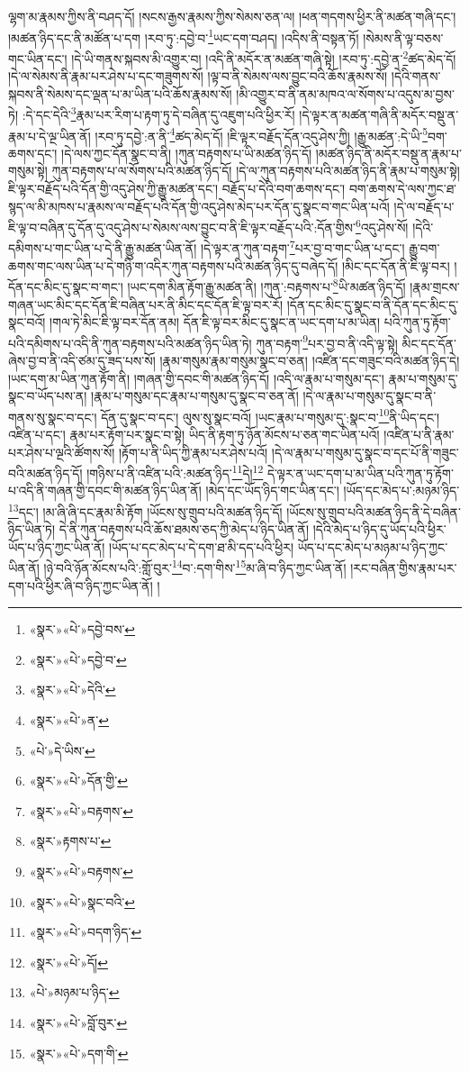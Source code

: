 ལྷག་མ་རྣམས་ཀྱིས་ནི་བཤད་དོ། །སངས་རྒྱས་རྣམས་ཀྱིས་སེམས་ཅན་ལ། །ཕན་གདགས་ཕྱིར་ནི་མཚན་གཞི་དང་། །མཚན་ཉིད་དང་ནི་མཚོན་པ་དག །རབ་ཏུ་:དབྱེ་བ་\footnote{«སྣར་»«པེ་»དབྱེ་བས་}ཡང་དག་བཤད། །འདིས་ནི་བསྟན་ཏོ། །སེམས་ནི་ལྟ་བཅས་གང་ཡིན་དང་། །དེ་ཡི་གནས་སྐབས་མི་འགྱུར་བ། །འདི་ནི་མདོར་ན་མཚན་གཞི་སྟེ། །རབ་ཏུ་:དབྱེ་ན་\footnote{«སྣར་»«པེ་»དབྱེ་བ་}ཚད་མེད་དོ། །དེ་ལ་སེམས་ནི་རྣམ་པར་ཤེས་པ་དང་གཟུགས་སོ། །ལྟ་བ་ནི་སེམས་ལས་བྱུང་བའི་ཆོས་རྣམས་སོ། །དེའི་གནས་སྐབས་ནི་སེམས་དང་ལྡན་པ་མ་ཡིན་པའི་ཆོས་རྣམས་སོ། །མི་འགྱུར་བ་ནི་ནམ་མཁའ་ལ་སོགས་པ་འདུས་མ་བྱས་ཏེ། :དེ་དང་དེའི་\footnote{«སྣར་»«པེ་»དེའི་}རྣམ་པར་རིག་པ་རྟག་ཏུ་དེ་བཞིན་དུ་འཇུག་པའི་ཕྱིར་རོ། །དེ་ལྟར་ན་མཚན་གཞི་ནི་མདོར་བསྡུ་ན་རྣམ་པ་དེ་ལྔ་ཡིན་ནོ། །རབ་ཏུ་དབྱེ་:ན་ནི་\footnote{«སྣར་»«པེ་»ན་}ཚད་མེད་དོ། །ཇི་ལྟར་བརྗོད་དོན་འདུ་ཤེས་ཀྱི། །རྒྱུ་མཚན་:དེ་ཡི་\footnote{«པེ་»དེ་ཡིས་}བག་ཆགས་དང་། །དེ་ལས་ཀྱང་དོན་སྣང་བ་ནི། །ཀུན་བརྟགས་པ་ཡི་མཚན་ཉིད་དོ། །མཚན་ཉིད་ནི་མདོར་བསྡུ་ན་རྣམ་པ་གསུམ་སྟེ། ཀུན་བརྟགས་པ་ལ་སོགས་པའི་མཚན་ཉིད་དོ། །དེ་ལ་ཀུན་བརྟགས་པའི་མཚན་ཉིད་ནི་རྣམ་པ་གསུམ་སྟེ། ཇི་ལྟར་བརྗོད་པའི་དོན་གྱི་འདུ་ཤེས་ཀྱི་རྒྱུ་མཚན་དང་། བརྗོད་པ་དེའི་བག་ཆགས་དང་། བག་ཆགས་དེ་ལས་ཀྱང་ཐ་སྙད་ལ་མི་མཁས་པ་རྣམས་ལ་བརྗོད་པའི་དོན་གྱི་འདུ་ཤེས་མེད་པར་དོན་དུ་སྣང་བ་གང་ཡིན་པའོ། །དེ་ལ་བརྗོད་པ་ཇི་ལྟ་བ་བཞིན་དུ་དོན་དུ་འདུ་ཤེས་པ་སེམས་ལས་བྱུང་བ་ནི་ཇི་ལྟར་བརྗོད་པའི་:དོན་གྱིས་\footnote{«སྣར་»«པེ་»དོན་གྱི་}འདུ་ཤེས་སོ། །དེའི་དམིགས་པ་གང་ཡིན་པ་དེ་ནི་རྒྱུ་མཚན་ཡིན་ནོ། །དེ་ལྟར་ན་ཀུན་བརྟག་\footnote{«སྣར་»«པེ་»བརྟགས་}པར་བྱ་བ་གང་ཡིན་པ་དང་། རྒྱུ་བག་ཆགས་གང་ལས་ཡིན་པ་དེ་གཉི་ག་འདིར་ཀུན་བརྟགས་པའི་མཚན་ཉིད་དུ་བཞེད་དོ། །མིང་དང་དོན་ནི་ཇི་ལྟ་བར། །དོན་དང་མིང་དུ་སྣང་བ་གང་། །ཡང་དག་མིན་རྟོག་རྒྱུ་མཚན་ནི། །ཀུན་:བརྟགས་པ་\footnote{«སྣར་»རྟགས་པ་}ཡི་མཚན་ཉིད་དོ། །རྣམ་གྲངས་གཞན་ཡང་མིང་དང་དོན་ཇི་བཞིན་པར་ནི་མིང་དང་དོན་ཇི་ལྟ་བར་རོ། །དོན་དང་མིང་དུ་སྣང་བ་ནི་དོན་དང་མིང་དུ་སྣང་བའོ། །གལ་ཏེ་མིང་ཇི་ལྟ་བར་དོན་ནམ། དོན་ཇི་ལྟ་བར་མིང་དུ་སྣང་ན་ཡང་དག་པ་མ་ཡིན། པའི་ཀུན་ཏུ་རྟོག་པའི་དམིགས་པ་འདི་ནི་ཀུན་བརྟགས་པའི་མཚན་ཉིད་ཡིན་ཏེ། ཀུན་བརྟག་\footnote{«སྣར་»«པེ་»བརྟགས་}པར་བྱ་བ་ནི་འདི་ལྟ་སྟེ། མིང་དང་དོན་ཞེས་བྱ་བ་ནི་འདི་ཙམ་དུ་ཟད་པས་སོ། །རྣམ་གསུམ་རྣམ་གསུམ་སྣང་བ་ཅན། །འཛིན་དང་གཟུང་བའི་མཚན་ཉིད་དེ། །ཡང་དག་མ་ཡིན་ཀུན་རྟོག་ནི། །གཞན་གྱི་དབང་གི་མཚན་ཉིད་དོ། །འདི་ལ་རྣམ་པ་གསུམ་དང་། རྣམ་པ་གསུམ་དུ་སྣང་བ་ཡོད་པས་ན། །རྣམ་པ་གསུམ་དང་རྣམ་པ་གསུམ་དུ་སྣང་བ་ཅན་ནོ། །དེ་ལ་རྣམ་པ་གསུམ་དུ་སྣང་བ་ནི་གནས་སུ་སྣང་བ་དང་། དོན་དུ་སྣང་བ་དང་། ལུས་སུ་སྣང་བའོ། །ཡང་རྣམ་པ་གསུམ་དུ་:སྣང་བ་\footnote{«སྣར་»«པེ་»སྣང་བའི་}ནི་ཡིད་དང་། འཛིན་པ་དང་། རྣམ་པར་རྟོག་པར་སྣང་བ་སྟེ། ཡིད་ནི་རྟག་ཏུ་ཉོན་མོངས་པ་ཅན་གང་ཡིན་པའོ། །འཛིན་པ་ནི་རྣམ་པར་ཤེས་པ་ལྔའི་ཚོགས་སོ། །རྟོག་པ་ནི་ཡིད་ཀྱི་རྣམ་པར་ཤེས་པའོ། །དེ་ལ་རྣམ་པ་གསུམ་དུ་སྣང་བ་དང་པོ་ནི་གཟུང་བའི་མཚན་ཉིད་དོ། །གཉིས་པ་ནི་འཛིན་པའི་:མཚན་ཉིད་\footnote{«སྣར་»«པེ་»བདག་ཉིད་}དེ།\footnote{«སྣར་»«པེ་»དོ།} དེ་ལྟར་ན་ཡང་དག་པ་མ་ཡིན་པའི་ཀུན་ཏུ་རྟོག་པ་འདི་ནི་གཞན་གྱི་དབང་གི་མཚན་ཉིད་ཡིན་ནོ། །མེད་དང་ཡོད་ཉིད་གང་ཡིན་དང་། །ཡོད་དང་མེད་པ་:མཉམ་ཉིད་\footnote{«པེ་»མཉམ་པ་ཉིད་}དང་། །མ་ཞི་ཞི་དང་རྣམ་མི་རྟོག །ཡོངས་སུ་གྲུབ་པའི་མཚན་ཉིད་དོ། །ཡོངས་སུ་གྲུབ་པའི་མཚན་ཉིད་ནི་དེ་བཞིན་ཉིད་ཡིན་ཏེ། དེ་ནི་ཀུན་བརྟགས་པའི་ཆོས་ཐམས་ཅད་ཀྱི་མེད་པ་ཉིད་ཡིན་ནོ། །དེའི་མེད་པ་ཉིད་དུ་ཡོད་པའི་ཕྱིར་ཡོད་པ་ཉིད་ཀྱང་ཡིན་ནོ། །ཡོད་པ་དང་མེད་པ་དེ་དག་ཐ་མི་དད་པའི་ཕྱིར། ཡོད་པ་དང་མེད་པ་མཉམ་པ་ཉིད་ཀྱང་ཡིན་ནོ། །ཉེ་བའི་ཉོན་མོངས་པའི་:གློ་བུར་\footnote{«སྣར་»«པེ་»བློ་བུར་}བ་:དག་གིས་\footnote{«སྣར་»«པེ་»དག་གི་}མ་ཞི་བ་ཉིད་ཀྱང་ཡིན་ནོ། །རང་བཞིན་གྱིས་རྣམ་པར་དག་པའི་ཕྱིར་ཞི་བ་ཉིད་ཀྱང་ཡིན་ནོ། །

